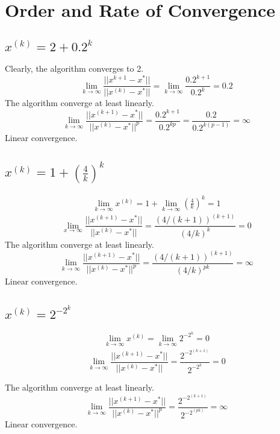  



\section{Order and Rate of Convergence}

\subsection{$x^{(k)} = 2 + 0.2^k$}
\par Clearly, the algorithm converges to 2.
\[
\lim_{k \to \infty} \frac{||x^{k+1} - x^*||}{||x^{(k)} - x^*||} = \lim_{k \to \infty} \frac{ 0.2^{k + 1}}{0.2^{k}} = 0.2
\]
The algorithm converge at least linearly.
\[
\lim_{k \to \infty} \frac{||x^{(k+1)} - x^*||}{||x^{(k)} - x^*||^p} = \frac{0.2^{k+1}}{0.2^{kp}} = \frac{0.2}{0.2^{k(p - 1)}} = \infty
\]
Linear convergence.

\subsection{$x^{(k)} = 1 + (\frac{4}{k})^k$}
\begin{align*}
\lim_{k\to\infty} x^{(k)} = 1 + \lim_{k\to\infty} (\frac{4}{k})^k = 1
\end{align*}
\[
\lim_{x \to \infty} \frac{||x^{(k+1)} - x^*||}{||x^{(k)} - x^*||} = \frac{(4/(k+1))^{(k+1)}}{(4/k)^k} = 0
\]
The algorithm converge at least linearly.
\[
\lim_{k \to \infty} \frac{||x^{(k+1)} - x^*||}{||x^{(k)} - x^*||^p} = \frac{(4/(k+1))^{(k+1)}}{(4/k)^{pk}} = \infty
\]
Linear convergence.

\subsection{$x^{(k)} = 2^{-2^k}$}
\begin{align*}
\lim_{k\to\infty} x^{(k)} =  \lim_{k\to\infty} 2^{-2^k}= 0
\end{align*}
\[
\lim_{k \to \infty} \frac{||x^{(k+1)} - x^*||}{||x^{(k)} - x^*||} = \frac{2^{-2^{(k+1)}}}{2^{-2^k}} = 0
\]

The algorithm converge at least linearly.
\[
\lim_{k \to \infty} \frac{||x^{(k+1)} - x^*||}{||x^{(k)} - x^*||^p} = \frac{2^{-2^{(k+1)}}}{2^{-2^(pk)}} = \infty
\]
Linear convergence.

